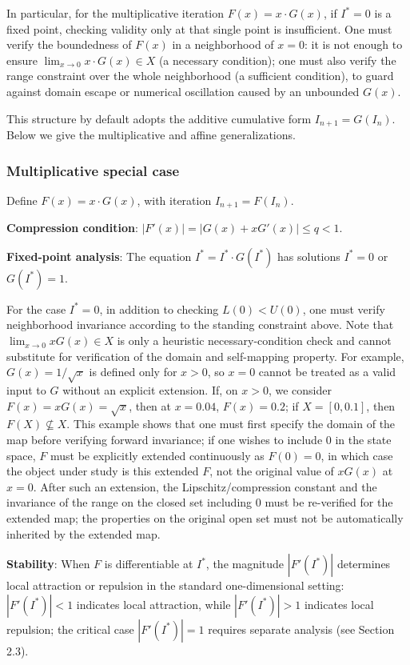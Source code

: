 \documentclass[11pt,a4paper]{amsart}
\begin{document}
In particular, for the multiplicative iteration $F(x) = x \cdot G(x)$, if $I^* = 0$ is a fixed point, checking validity only at that single point is insufficient. One must verify the boundedness of $F(x)$ in a neighborhood of $x = 0$: it is not enough to ensure $\lim_{x \to 0} x \cdot G(x) \in X$ (a necessary condition); one must also verify the range constraint over the whole neighborhood (a sufficient condition), to guard against domain escape or numerical oscillation caused by an unbounded $G(x)$.

This structure by default adopts the additive cumulative form $I_{n+1} = G(I_n)$. Below we give the multiplicative and affine generalizations.

\subsubsection{Multiplicative special case}

Define $F(x) = x \cdot G(x)$, with iteration $I_{n+1} = F(I_n)$.

\textbf{Compression condition}: $|F'(x)| = |G(x) + xG'(x)| \le q < 1$.

\textbf{Fixed-point analysis}: The equation $I^* = I^* \cdot G(I^*)$ has solutions $I^* = 0$ or $G(I^*) = 1$.

For the case $I^* = 0$, in addition to checking $L(0) < U(0)$, one must verify neighborhood invariance according to the standing constraint above. Note that $\lim_{x \to 0} xG(x) \in X$ is only a heuristic necessary-condition check and cannot substitute for verification of the domain and self-mapping property. For example, $G(x) = 1/\sqrt{x}$ is defined only for $x > 0$, so $x = 0$ cannot be treated as a valid input to $G$ without an explicit extension. If, on $x > 0$, we consider $F(x) = xG(x) = \sqrt{x}$, then at $x = 0.04$, $F(x) = 0.2$; if $X = [0, 0.1]$, then $F(X) \not\subseteq X$. This example shows that one must first specify the domain of the map before verifying forward invariance; if one wishes to include $0$ in the state space, $F$ must be explicitly extended continuously as $F(0) = 0$, in which case the object under study is this extended $F$, not the original value of $xG(x)$ at $x = 0$. After such an extension, the Lipschitz/compression constant and the invariance of the range on the closed set including $0$ must be re-verified for the extended map; the properties on the original open set must not be automatically inherited by the extended map.

\textbf{Stability}: When $F$ is differentiable at $I^*$, the magnitude $|F'(I^*)|$ determines local attraction or repulsion in the standard one-dimensional setting: $|F'(I^*)| < 1$ indicates local attraction, while $|F'(I^*)| > 1$ indicates local repulsion; the critical case $|F'(I^*)| = 1$ requires separate analysis (see Section 2.3).
\end{document}
